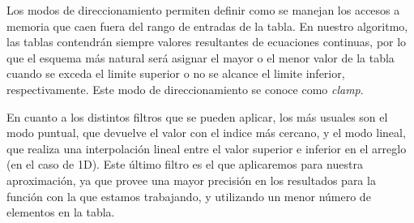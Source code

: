 Los modos de direccionamiento permiten definir como se manejan los accesos a memoria que caen fuera del rango de entradas de la tabla.
En nuestro algoritmo, las tablas contendrán siempre valores resultantes de ecuaciones continuas, por lo que el esquema más natural será asignar el mayor o el menor valor de la tabla cuando se exceda el limite superior o no se alcance el limite inferior, respectivamente. 
Este modo de direccionamiento se conoce como \textit{clamp}.

  
  
En cuanto a los distintos filtros que se pueden aplicar, los más usuales son el modo puntual, que devuelve el valor con el indice más cercano, y el modo lineal, 
que realiza una interpolación lineal entre el valor superior e inferior en el arreglo (en el caso de 1D). 
Este último filtro es el que aplicaremos para nuestra aproximación, ya que provee una mayor precisión en los resultados para la función con la que estamos trabajando, y utilizando un menor número de elementos en la tabla.



